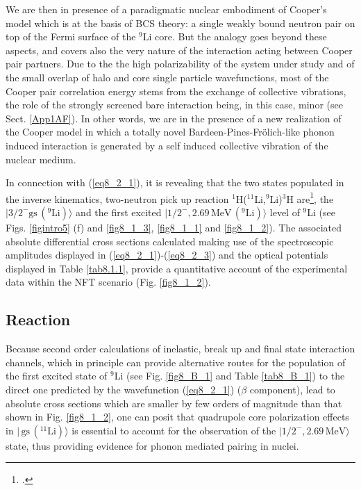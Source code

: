 We are then in presence of a paradigmatic nuclear embodiment of Cooper's model which is at the basis of BCS theory: a single weakly bound neutron pair on top of the Fermi surface of the ${}^9$Li core. But the analogy goes beyond these aspects, and covers also the very nature of the interaction acting between Cooper pair partners. Due to the  the high polarizability of the system under study and of the small overlap of halo and core single particle wavefunctions, most of the Cooper pair correlation energy stems from the exchange of collective vibrations, the role of the strongly screened bare interaction being, in this case, minor  (see Sect. \ref{App1AF}). In other words, we are in the presence of a new realization of the Cooper model in which a totally novel Bardeen-Pines-Fr\"olich-like phonon induced interaction is generated by a self induced collective vibration of the nuclear medium.



 In connection with  (\ref{eq8_2_1}), it is revealing that the two states populated in the  inverse kinematics, two-neutron pick up reaction $^1$H($^{11}$Li,$^9$Li)$^3$H are\footnote{\cite{Tanihata:08}.}, the $|3/2^-\text{gs}\,(^9\text{Li})\rangle$ and the first excited $|1/2^-,2.69\,\text{MeV}\,(^9\text{Li})\rangle$ level of $^9$Li  (see Figs. \ref{figintro5} (f) and  \ref{fig8_1_3}, \ref{fig8_1_1} and \ref{fig8_1_2}). The associated absolute differential cross sections calculated making use of the spectroscopic amplitudes displayed in (\ref{eq8_2_1})-(\ref{eq8_2_3}) and the optical potentials displayed in Table \ref{tab8.1.1}, provide a quantitative account of the experimental data  within the NFT scenario (Fig. \ref{fig8_1_2}).  
 
 
 
\subsection{Reaction}\label{C6S1.2}
Because second order calculations of inelastic, break up and final state interaction channels, which in principle can provide alternative routes for the population of the first excited state of $^9$Li (see Fig. \ref{fig8_B_1} and Table \ref{tab8_B_1}) to the direct one predicted by the wavefunction (\ref{eq8_2_1})  ($\beta$ component), lead to absolute cross sections which are smaller by few orders of magnitude than that shown in Fig. \ref{fig8_1_2}, one can posit that quadrupole core polarization effects in $|\,\text{gs}\,(^{11}\text{Li})\rangle$ is essential to account for the observation of the $|1/2^-,2.69\,\text{MeV}\rangle$ state, thus providing
  evidence for phonon mediated pairing in nuclei. 
 
